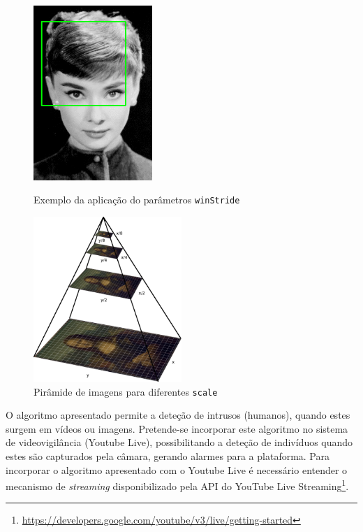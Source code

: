 \begin{figure}[h]
	\centering
	\begin{minipage}[b]{0.49\textwidth}
		\centering
		\includegraphics[width=0.4\textwidth]{img/sliding_window_example-11.png}
		\caption{Exemplo da aplicação do parâmetros \texttt{winStride} }
		\label{winStride}
	\end{minipage}
	\hfill
	\begin{minipage}[b]{0.49\textwidth}
		\centering
		\includegraphics[width=0.5\textwidth]{img/pyramid.png}
		\caption{Pirâmide de imagens para diferentes \texttt{scale}}
		\label{scale}
	\end{minipage}
	
\end{figure}




O algoritmo apresentado permite a deteção de intrusos (humanos), quando estes surgem em vídeos ou imagens. Pretende-se incorporar este algoritmo no sistema de videovigilância (Youtube Live), possibilitando a deteção de indivíduos quando estes são capturados pela câmara, gerando alarmes para a plataforma. Para incorporar o algoritmo apresentado com o Youtube Live é necessário entender o mecanismo de \textit{streaming} disponibilizado pela \ac{API} do YouTube Live Streaming\footnote{\url{https://developers.google.com/youtube/v3/live/getting-started}}.  


